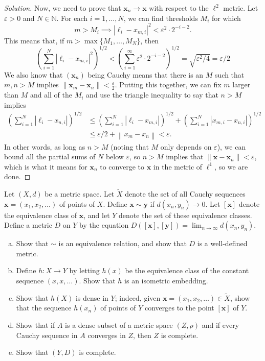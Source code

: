 \documentclass[10pt]{article}
\providecommand{\eps}{\varepsilon}
\providecommand{\NN}{\mathbb N}
\providecommand{\ii}{\item}
\providecommand{\mb}[1]{\mathbf{#1}}
\newenvironment{soln}{\begin{proof}[Solution]}{\end{proof}}
\providecommand{\norm}[1]{\left\|#1\right\|}
\begin{document}
\begin{soln}
    Now, we need to prove that $\mb x_n\to\mb x$
    with respect to the $\ell^2$ metric. Let $\eps>0$ and $N\in\NN$.
    For each $i=1,\dots,N$, we can find thresholds $M_i$ for which
    \[m > M_i \implies |\ell_i - x_{m,i}|^2 < \eps^2\cdot 2^{-i - 2}.\]
    This means that, if $m > \max\{M_1, \dots, M_N\}$, then
    \[\left(\sum_{i=1}^N |\ell_i - x_{m,i}|^2\right)^{1/2}
    < \left(\sum_{i=1}^\infty \eps^2\cdot 2^{-i-2}\right)^{1/2}
    = \sqrt{\eps^2/4} = \eps/2\]
    We also know that $(\mb x_n)$ being Cauchy means that
    there is an $M$ such that
    $m,n > M$ implies $\|\mb x_m - \mb x_n\| < \frac\eps2$.
    Putting this together, we can fix
    $m$ larger than $M$ and all of the $M_i$
    and use the triangle inequality to say that
    $n > M$ implies
    \begin{align*}
	\left(\sum_{i=1}^N |\ell_i - x_{n,i}|\right)^{1/2}
	&\le \left(\sum_{i=1}^N |\ell_i - x_{m,i}|\right)^{1/2} +
	\left(\sum_{i=1}^N |x_{m,i} - x_{n,i}|\right)^{1/2}\\
	&\le \eps/2 + \norm{x_m - x_n} < \eps.
    \end{align*}
    In other words, as long as $n > M$ (noting that $M$ only depends on $\eps$),
    we can bound all the partial sums of $N$ below $\eps$,
    so $n > M$ implies that $\|\mb x - \mb x_n\| < \eps$,
    which is what it means for $\mb x_n$ to converge to $\mb x$
    in the metric of $\ell^1$, so we are done.
\end{soln}

\begin{problem}
    [Munkres 43.9]
    Let $(X,d)$ be a metric space. Let $\tilde X$ denote the set
    of all Cauchy sequences $\mb x = (x_1,x_2,\dots)$ of points of $X$.
    Define $\mb x\sim\mb y$ if $d(x_n,y_n)\to 0$.
    Let $[\mb x]$ denote the equivalence class of $\mb x$,
    and let $Y$ denote the set of these equivalence classes.
    Define a metric $D$ on $Y$ by the equation
    $D([\mb x],[\mb y]) = \lim_{n\to\infty} d(x_n,y_n)$.
    \begin{enumerate}[(a)]
	\ii Show that $\sim$ is an equivalence relation,
	and show that $D$ is a well-defined metric.
	\ii Define $h\colon X\to Y$ by letting $h(x)$ be
	the equivalence class of the constant sequence $(x,x,\dots)$.
	Show that $h$ is an isometric embedding.
	\ii Show that $h(X)$ is dense in $Y$;
	indeed, given $\mb x = (x_1,x_2,\dots)\in\tilde X$,
	show that the sequence $h(x_n)$ of points of $Y$
	converges to the point $[\mb x]$ of $Y$.
	\ii Show that if $A$ is a dense subset of a metric space $(Z,\rho)$
	and if every Cauchy sequence in $A$ converges in $Z$,
	then $Z$ is complete.
	\ii Show that $(Y,D)$ is complete.
\end{enumerate}
\end{problem}
\end{document}
